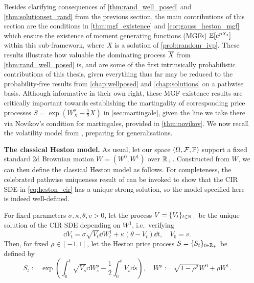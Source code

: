 Besides clarifying consequences of \autoref{thm:rand_well_posed} and \autoref{thm:solutionset_rand} from the previous section, the main contributions of this section are the conditions in \autoref{thm:mgf_existence} and \autoref{cor:gauss_heston_mgf} which ensure the existence of moment generating functions (MGFs) $\mathbb{E}[e^{pX_t}]$ within this sub-framework, where $X$ is a solution of \autoref{prob:random_ivp}. These results illustrate how valuable the dominating process ${\overline{X}}$ from \autoref{thm:rand_well_posed} is, and are some of the first intrinsically probabilistic contributions of this thesis, given everything thus far may be reduced to the probability-free results from \autoref{chap:wellposed} and \autoref{chap:solutions} on a pathwise basis. Although informative in their own right, these MGF existence results are critically important towards establishing the martingality of corresponding price processes $S = \exp(W^\rho_X - \frac12 X)$ in \autoref{sec:martingale}, given the line we take there via Novikov's condition for martingales, provided in \autoref{thm:novikov}. We now recall the volatility model from \cite{heston_1993}, preparing for generalisations.

\vspace{3mm}\textbf{The classical Heston model.} As usual, let our space $(\Omega,\mathcal{F},\mathbb{P})$ support a fixed standard 2d Brownian motion $W=(W^0,W^1)$ over $\mathbb{R}_+$. Constructed from $W$, we can then define the classical Heston model as follows. For completeness, the celebrated pathwise uniqueness result of \cite{yamada_1971} can be invoked to show that the CIR SDE in \autoref{eq:heston_cir} has a unique strong solution, so the model specified here is indeed well-defined.

\begin{definition}\label{def:heston_stoch_vol}
    For fixed parameters $\sigma,\kappa,\theta,v > 0$, let the process $V=\{V_t\}_{t\in\mathbb{R}_+}$ be the unique solution of the CIR SDE depending on $W^1$, i.e.~verifying
    \begin{equation}\label{eq:heston_cir}
        \dd V_t = \sigma\sqrt{V_t}\dd W^1_t + \kappa(\theta - V_t)\dd t,\quad V_0=v.
    \end{equation}
    Then, for fixed $\rho\in[-1,1]$, let the Heston price process $S=\{S_t\}_{t\in\mathbb{R}_+}$ be defined by
    \begin{equation}\label{eq:heston_stock}
        S_t := \exp\left(\int_0^t\sqrt{V_s}\dd W^\rho_s - \frac12 \int_0^t V_s\dd s\right),\quad W^\rho := \sqrt{1-\rho^2} W^0 + \rho W^1.
    \end{equation}
\end{definition}

